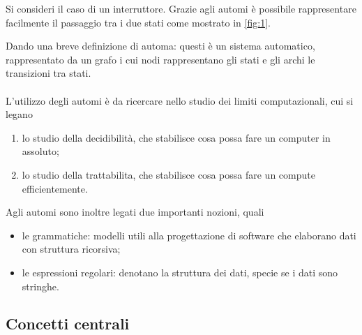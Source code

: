 \documentclass{subfiles}
\begin{document}
Si consideri il caso di un interruttore. Grazie agli automi è possibile rappresentare facilmente il passaggio tra i due stati come mostrato in \ref{fig:1}.


\label{sec:1}
Dando una breve definizione di automa: questi è un sistema automatico, rappresentato da un grafo i cui nodi rappresentano gli stati e gli archi le transizioni tra stati.
\\ \\
L'utilizzo degli automi è da ricercare nello studio dei limiti computazionali, cui si legano
\begin{enumerate}
    \item lo studio della decidibilità, che stabilisce cosa possa fare un computer in assoluto;
    \item lo studio della trattabilita, che stabilisce cosa possa fare un compute efficientemente.
\end{enumerate}

Agli automi sono inoltre legati due importanti nozioni, quali
\begin{itemize}
    \item le grammatiche: modelli utili alla progettazione di software che elaborano dati con struttura ricorsiva;
    \item le espressioni regolari: denotano la struttura dei dati, specie se i dati sono stringhe.
\end{itemize}

\subsection{Concetti centrali}

\end{document}
